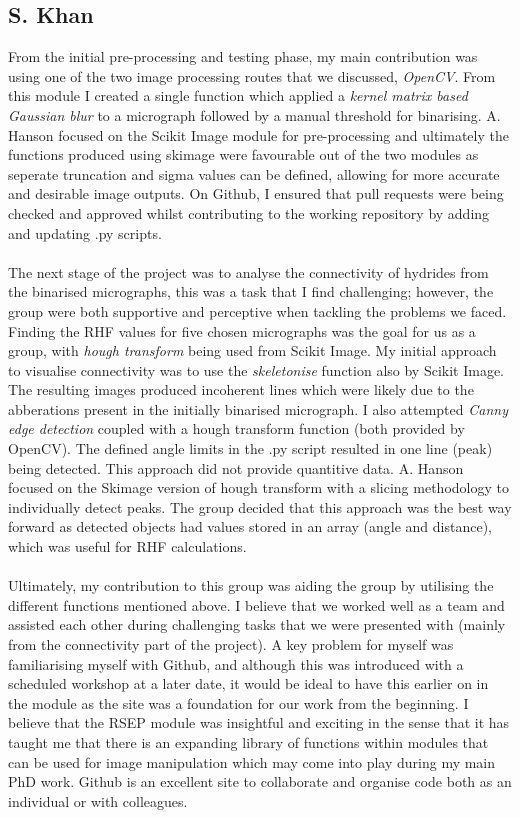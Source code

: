 \documentclass{article}
\begin{document}
\subsection{S. Khan}
From the initial pre-processing and testing phase, my main contribution was using one of the two image processing routes that we discussed, \textit{OpenCV}. From this module I created a single function which applied a \textit{kernel matrix based Gaussian blur} to a micrograph followed by a manual threshold for binarising. A. Hanson focused on the Scikit Image module for pre-processing and ultimately the functions produced using skimage were favourable out of the two modules as seperate truncation and sigma values can be defined, allowing for more accurate and desirable image outputs. On Github, I ensured that pull requests were being checked and approved whilst contributing to the working repository by adding and updating .py scripts.
\\ \\
The next stage of the project was to analyse the connectivity of hydrides from the binarised micrographs, this was a task that I find challenging; however, the group were both supportive and perceptive when tackling the problems we faced. Finding the RHF values for five chosen micrographs was the goal for us as a group, with \textit{hough transform} being used from Scikit Image. My initial approach to visualise connectivity was to use the \textit{skeletonise} function also by Scikit Image. The resulting images produced incoherent lines which were likely due to the abberations present in the initially binarised micrograph. I also attempted \textit{Canny edge detection} coupled with a hough transform function (both provided by OpenCV). The defined angle limits in the .py script resulted in one line (peak) being detected. This approach did not provide quantitive data. A. Hanson focused on the Skimage version of hough transform with a slicing methodology to individually detect peaks. The group decided that this approach was the best way forward as detected objects had values stored in an array (angle and distance), which was useful for RHF calculations.
\\ \\
Ultimately, my contribution to this group was aiding the group by utilising the different functions mentioned above. I believe that we worked well as a team and assisted each other during challenging tasks that we were presented with (mainly from the connectivity part of the project). A key problem for myself was familiarising myself with Github, and although this was introduced with a scheduled workshop at a later date, it would be ideal to have this earlier on in the module as the site was a foundation for our work from the beginning. I believe that the RSEP module was insightful and exciting in the sense that it has taught me that there is an expanding library of functions within modules that can be used for image manipulation which may come into play during my main PhD work. Github is an excellent site to collaborate and organise code both as an individual or with colleagues.
\end{document}
